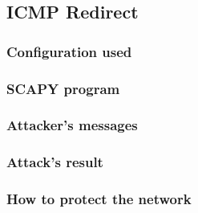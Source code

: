 \subsection{ICMP Redirect}
\subsubsection{Configuration used}

\subsubsection{SCAPY program}


\subsubsection{Attacker's messages}

\subsubsection{Attack's result}


\subsubsection{How to protect the network}

